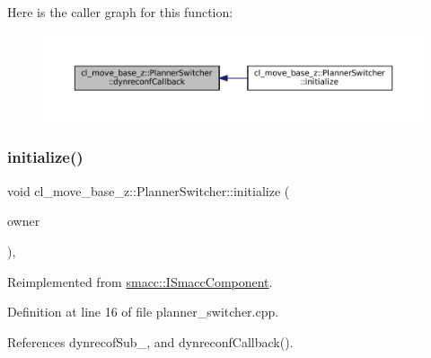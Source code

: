 Here is the caller graph for this function\+:
\nopagebreak
\begin{figure}[H]
\begin{center}
\leavevmode
\includegraphics[width=350pt]{classcl__move__base__z_1_1PlannerSwitcher_ad9371bd8d62600ef874e8914c3ec177b_icgraph}
\end{center}
\end{figure}
\mbox{\label{classcl__move__base__z_1_1PlannerSwitcher_a8180bda19d3fdc2bcb3d9792002cd325}} 
\subsubsection{\texorpdfstring{initialize()}{initialize()}}
{\footnotesize\ttfamily void cl\+\_\+move\+\_\+base\+\_\+z\+::\+Planner\+Switcher\+::initialize (\begin{DoxyParamCaption}\item[{\hyperlink{classsmacc_1_1ISmaccClient}{smacc\+::\+I\+Smacc\+Client} $\ast$}]{owner }\end{DoxyParamCaption})\hspace{0.3cm}{\ttfamily [override]}, {\ttfamily [virtual]}}



Reimplemented from \hyperlink{classsmacc_1_1ISmaccComponent_a3378552cb1a86aa26a07c0edc057448b}{smacc\+::\+I\+Smacc\+Component}.



Definition at line 16 of file planner\+\_\+switcher.\+cpp.



References dynrecof\+Sub\+\_\+, and dynreconf\+Callback().


